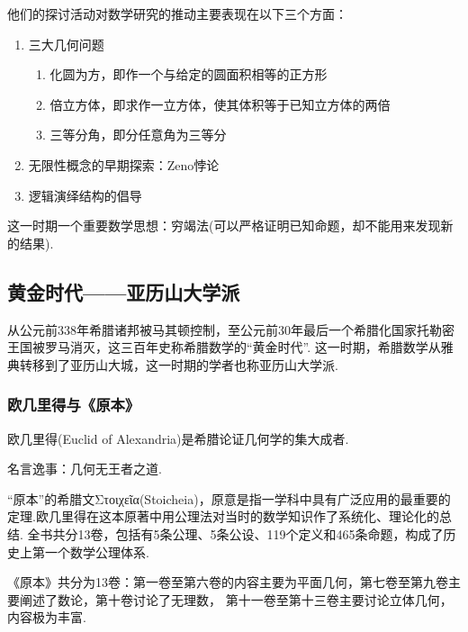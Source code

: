 \documentclass{Math_Note}
\begin{document}
他们的探讨活动对数学研究的推动主要表现在以下三个方面：
\begin{enumerate}
    \item 三大几何问题
    \begin{enumerate}
        \item 化圆为方，即作一个与给定的圆面积相等的正方形
        \item 倍立方体，即求作一立方体，使其体积等于已知立方体的两倍
        \item 三等分角，即分任意角为三等分
    \end{enumerate}
    \item 无限性概念的早期探索：Zeno悖论
    \item 逻辑演绎结构的倡导
\end{enumerate}

这一时期一个重要数学思想：穷竭法(可以严格证明已知命题，却不能用来发现新的结果).

\subsection{黄金时代——亚历山大学派}
从公元前338年希腊诸邦被马其顿控制，至公元前30年最后一个希腊化国家托勒密王国被罗马消灭，这三百年史称希腊数学的“黄金时代”.
这一时期，希腊数学从雅典转移到了亚历山大城，这一时期的学者也称亚历山大学派.
\subsubsection{欧几里得与《原本》}
欧几里得(Euclid of Alexandria)是希腊论证几何学的集大成者.

名言逸事：几何无王者之道.

“原本”的希腊文Στοιχεῖα(Stoicheia)，原意是指一学科中具有广泛应用的最重要的定理.欧几里得在这本原著中用公理法对当时的数学知识作了系统化、理论化的总结.
全书共分13卷，包括有5条公理、5条公设、119个定义和465条命题，构成了历史上第一个数学公理体系.

《原本》共分为13卷：第一卷至第六卷的内容主要为平面几何，第七卷至第九卷主要阐述了数论，第十卷讨论了无理数，
第十一卷至第十三卷主要讨论立体几何，内容极为丰富.
\end{document}
